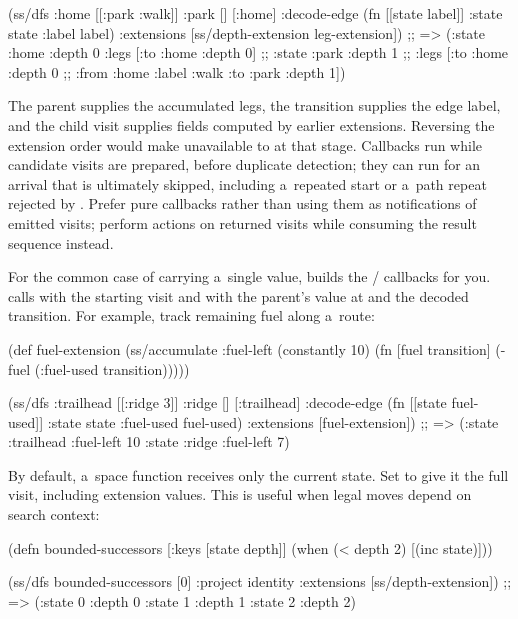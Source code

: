 (ss/dfs {:home [[:park :walk]] :park []} [:home]
        {:decode-edge (fn [[state label]]
                        {:state state :label label})
         :extensions [ss/depth-extension leg-extension]})
;; => ({:state :home :depth 0 :legs [{:to :home :depth 0}]}
;;     {:state :park :depth 1
;;      :legs [{:to :home :depth 0}
;;             {:from :home :label :walk :to :park :depth 1}]})
\endtt

The parent supplies the accumulated legs, the transition supplies the edge
label, and the child visit supplies fields computed by earlier extensions.
Reversing the extension order would make  unavailable to
 at that stage. Callbacks run while candidate visits
are prepared, before duplicate detection; they can run for an arrival that
is ultimately skipped, including a~repeated start or a~path repeat rejected
by . Prefer pure callbacks rather than using them as
notifications of emitted visits; perform actions on returned visits while
consuming the result sequence instead.

For the common case of carrying a~single value,  builds
the / callbacks for you.
 calls  with the starting
visit and  with the parent's value at  and the decoded
transition. For example, track remaining fuel along a~route:

\begtt {}
(def fuel-extension
  (ss/accumulate :fuel-left (constantly 10)
                     (fn [fuel transition]
                       (- fuel (:fuel-used transition)))))

(ss/dfs {:trailhead [[:ridge 3]]
         :ridge []}
        [:trailhead]
        {:decode-edge (fn [[state fuel-used]]
                        {:state state :fuel-used fuel-used})
         :extensions [fuel-extension]})
;; => ({:state :trailhead :fuel-left 10} {:state :ridge :fuel-left 7})
\endtt

By default, a~space function receives only the current state. Set
 to give it the full visit, including extension
values. This is useful when legal moves depend on search context:

\begtt {}
(defn bounded-successors [{:keys [state depth]}]
  (when (< depth 2)
    [(inc state)]))

(ss/dfs bounded-successors [0]
            {:project identity
             :extensions [ss/depth-extension]})
;; => ({:state 0 :depth 0} {:state 1 :depth 1} {:state 2 :depth 2})
\endtt

